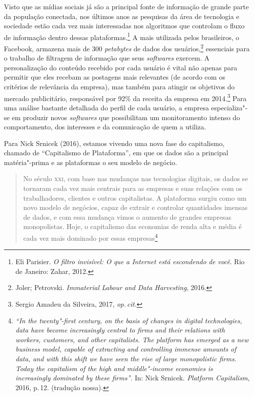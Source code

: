 Visto que as mídias sociais já são a principal fonte de informação de
grande parte da população conectada, nos últimos anos as pesquisas da
área de tecnologia e sociedade estão cada vez mais interessadas nos
algoritmos que controlam o fluxo de informação dentro dessas plataformas.\footnote{Eli Parisier. \emph{O filtro invisível: O que a Internet está escondendo
de você}. Rio de Janeiro: Zahar, 2012.}
A mais utilizada pelos brasileiros, o Facebook,
armazena mais de 300 \emph{petabytes} de dados dos usuários,\footnote{Joler; Petrovski. \emph{Immaterial Labour and Data Harvesting}, 2016.}
essenciais para o trabalho de filtragem de informação que seus \emph{softwares} exercem. A personalização do conteúdo recebido por cada usuário é vital
não apenas para permitir que eles recebam as postagens mais relevantes
(de acordo com os critérios de relevância da empresa), mas também para
atingir os objetivos do mercado publicitário, responsável por 92\% da
receita da empresa em 2014.\footnote{Sergio Amadeu da Silveira, 2017, \textit{op.\,cit.}} Para uma análise bastante
detalhada do perfil de cada usuário, a empresa especializa"-se em
produzir novos \emph{softwares} que possibilitam um monitoramento intenso do
comportamento, dos interesses e da comunicação de quem a utiliza.

Para Nick Srnicek (2016), estamos vivendo uma nova fase do capitalismo,
chamado de ``Capitalismo de Plataforma'', em que os dados são a
principal matéria"-prima e as plataformas o seu modelo de negócio.

\begin{quote}
No século \textsc{xxi}, com base nas mudanças nas tecnologias digitais, os dados
se tornaram cada vez mais centrais para as empresas e suas relações com
os trabalhadores, clientes e outros capitalistas. A plataforma surgiu
como um novo modelo de negócios, capaz de extrair e controlar
quantidades imensas de dados, e com essa mudança vimos o aumento de
grandes empresas monopolistas. Hoje, o capitalismo das economias de
renda alta e média é cada vez mais dominado por essas empresas\footnote{\emph{``In
  the twenty"-first century, on the basis of changes in digital
  technologies, data have become increasingly central to firms and their
  relations with workers, customers, and other capitalists. The platform
  has emerged as a new business model, capable of extracting and
  controlling immense amounts of data, and with this shift we have seen
  the rise of large monopolistic firms. Today the capitalism of the high
  and middle"-income economies is increasingly dominated by these
  firms''}. In: Nick Srnicek. \emph{Platform Capitalism}, 2016, p.\,12. (tradução nossa).}
\end{quote}

